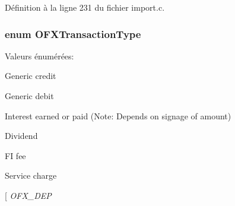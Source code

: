 Définition à la ligne 231 du fichier import.c.

\subsubsection[{OFXTransactionType}]{\setlength{\rightskip}{0pt plus 5cm}enum {\bf OFXTransactionType}}\label{import_8c_a735cf9b89f806f2be4c52117c5057173}
\begin{Desc}
\item[Valeurs énumérées: ]\par
\begin{description}
\item[{\em 
OFX\_\-CREDIT\label{import_8c_a735cf9b89f806f2be4c52117c5057173a55a44ce2b4561d75e1387d14bf4346e3}
}]Generic credit \item[{\em 
OFX\_\-DEBIT\label{import_8c_a735cf9b89f806f2be4c52117c5057173ab60c4a61836e4c9eddd43df98f58f25a}
}]Generic debit \item[{\em 
OFX\_\-INT\label{import_8c_a735cf9b89f806f2be4c52117c5057173a6c561a0df9837463a7badde944a6c6ce}
}]Interest earned or paid (Note: Depends on signage of amount) \item[{\em 
OFX\_\-DIV\label{import_8c_a735cf9b89f806f2be4c52117c5057173adbf02dcc7c9b4bb5de5e0126127ec482}
}]Dividend \item[{\em 
OFX\_\-FEE\label{import_8c_a735cf9b89f806f2be4c52117c5057173ad0b1678dd27d1caa1e0464b471b49d5b}
}]FI fee \item[{\em 
OFX\_\-SRVCHG\label{import_8c_a735cf9b89f806f2be4c52117c5057173a94c350d04bb151bc7af01285f8564ff2}
}]Service charge \item[{\em 
OFX\_\-DEP\label{import_8c_a735cf9b89f806f2be4c52117c5057173ad47566169d26dcbd4effe5bee0a5e02d}
}
\end{description}
\end{Desc}
